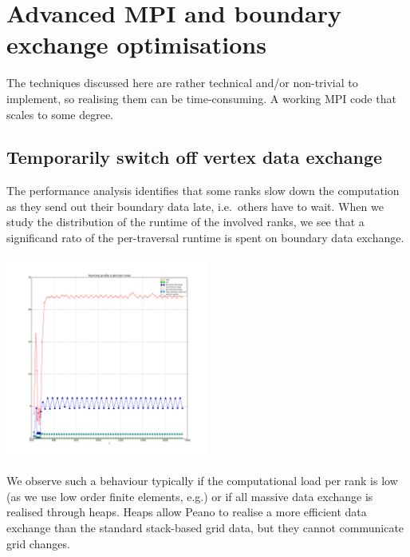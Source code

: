 \section{Advanced MPI and boundary exchange optimisations}


\chapterDescription
  {
    The techniques discussed here are rather technical and/or non-trivial to
    implement, so realising them can be time-consuming.
  }
  {
    A working MPI code that scales to some degree.
  }



\subsection{Temporarily switch off vertex data exchange}
\label{section:64_advanced-mpi:switch-off-vertex-data-exchange}

\begin{smell}
  The performance analysis identifies that some ranks slow down the computation
  as they send out their boundary data late, i.e.~others have to wait. When we
  study the distribution of the runtime of the involved ranks, we see that a
  significand rato of the per-traversal runtime is spent on boundary data
  exchange.
\end{smell}


\begin{center}
  \includegraphics[width=0.5\textwidth]{64_advanced-mpi/boundary-exchange.pdf}
\end{center}


\noindent
We observe such a behaviour typically if the computational load per rank is low
(as we use low order finite elements, e.g.) or if all massive data exchange is
realised through heaps.
Heaps allow Peano to realise a more efficient data exchange than the standard
stack-based grid data, but they cannot communicate grid changes.

